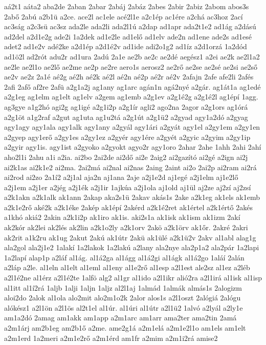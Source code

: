 {aá2t1
aáta2
aba2de
2aban
2abar
2abáj
2abáz
2abes
2abir
2abiz
2abom
abos3s
2abő
2abú
a2b1ü
a2ce.
ace2l
ac1ele
acé2l1e
a2c1ép
ac1ére
a2chá
ac3hoz
2ací
ac3ság
a2c3sü
ac3sz
ada2le
ada2li
ada2l1ú
a2dap
ad1apr
ada2t1e2
ad1ág
a2dású
ad2del
a2d1e2g
ade2i
1a2dek
ad1e2le
ad1elő
ad1elv
ade2n
ad1ene
ade2s
ad1esé
adet2
ad1e2v
adé2ke
a2d1ép
a2d1é2v
ad1ide
adi2o1g2
ad1íz
a2d1orzá
1a2dód
ad1ö2l
ad2rót
adu2r
ad1ura
2adú
2a1e
ae2b
ae2c
ae2dé
aegész1
a2ei
ae2k
ae2l1a2
ae2le
ae2l1o
ae2lő
ae2me
ae2p
ae2re
aero1s
aerosz2
ae2rő
ae2se
ae2sé
ae2si
ae2ső
ae2v
ae2z
2a1é
aé2g
aé2h
aé2k
aé2l
aé2n
aé2p
aé2r
aé2v
2afajn
2afe
afe2li
2afés
2afi
2afő
af2re
2afü
a2g1a2j
ag1any
ag1arc
agán1n
agá2nyé
a2gár.
ag1át1a
ag1edé
a2g1eg
ag1elm
ag1elt
ag1elv
a2gem
ag1emb
a2g1ev
a2g1é2g
a2g1é2l
ag1épí
1agg.
ag3gye
a1g2hó
agi2g
ag1igé
a2g1i2p
a2g1ír
agli2
ago2na
2agor
a2g1ors
ag1órá
a2g1öt
a1g2raf
a2gut
ag1uta
ag1u2tá
a2g1út
a2g1ü2
a2gyad
agy1a2dó
a2gyag
agy1agy
agy1ala
agy1alk
agy1any
a2gyál
agy1ári
a2gyát
agy1el
a2gy1em
a2gy1en
a2gyep
agy1erő
a2gy1es
a2gy1ez
a2gyér
agy1ére
a2gyét
a2gyic
a2gyim
a2gy1ip
a2gyir
agy1is.
agy1ist
a2gyoko
a2gyokt
agyo2r
agy1oro
2ahar
2ahe
1ahh
2ahi
2ahí
aho2l1i
2ahu
a1i
a2ia.
ai2bo
2ai2de
ai2dő
ai2e
2aig2
ai2gazító
ai2gé
a2ign
ai2j
ai2k1as
ai2k1e2
ai2ma.
2ai2má
ai2nal
ai2nas
2aing
2aint
ai2o
2ai2p
ai2ram
ai2rá
ai2rod
ai2zo
2a1í2
a2j1al
aja2n
aj1ana
2aje
a2j1e2d
aj1egé
a2j1elm
aj1e2lő
a2j1em
a2j1er
a2jég
a2j1ék
a2j1ir
1ajkúa
a2j1ola
aj1old
aj1ül
aj2ze
aj2zí
aj2zsí
a2k1akn
a2k1alk
ak1ann
2akap
aka2s1ü
2akav
akás1s
2ake
a2k1eg
ak1els
ak1emb
a2k1e2rő
aké2k
a2k1éke
2akép
ak1épí
2akérd
a2k1é2ret
ak1értel
a2k1értő
2akés
a1khó
akiá2
2akin
a2k1i2p
ak1iro
ak1is.
aki2s1a
ak1isk
ak1ism
ak1izm
2akí
ak2kór
ak2lei
ak2lés
ak2lin
a2k1o2ly
a2k1orv
2akö
a2k1örv
ak1őr.
2akré
2akri
ak2rit
a1k2ru
ak1ug
2akut
2akú
ak1útr
2akü
ak1ülé
a2k1ü2v
2akv
al1abl
alag1g
ala2gol
ala2j1e2
1alakí
1a2lakok
1a2lakú
a2lany
ala2nye
ala2p1a2
ala2pár
1a2lapi
1a2lapí
alap1p
a2láf
al1ág.
al1á2ga
al1ágg
al1á2gi
al1ágk
al1á2go
1aláí
2alán
a2láp
a2le.
al1eln
al1elt
al1eml
al1eny
al1e2rő
al1esp
a2l1est
ale2sz
al1ez
a2léb
a2l1é2ne
al1érz
a2l1é2te
1alfö
alg2
al1gr
al1ido
a2l1ikr
alió2ra
a2l1irá
al1isk
al1isp
al1itt
al1í2rá
1aljb
1alji
1aljn
1aljz
al2l1aj
1almád
1almák
almás1s
2alogizm
aloi2do
2alok
al1ola
alo2mit
alo2m1o2k
2alor
alos1s
a2l1oszt
2alógiá
2alógu
alókész1
a2l1ön
a2l1ös
al2t1el
al1úr.
al1úri
al1útr
a2l1ü2
1alvó
a2lyál
a2ly1e
am1a2dó
2amag
am1akk
am1app
a2m1arc
am1arr
ama2ter
ama2tin
2amá
a2m1árj
am2b1eg
am2b1ő
a2me.
ame2g1á
a2m1elá
a2m1e2l1o
am1els
am1elt
a2m1erd
1a2meri
a2m1e2rő
a2m1érd
am1fr
a2mim
a2m1i2rá
amise2
}
